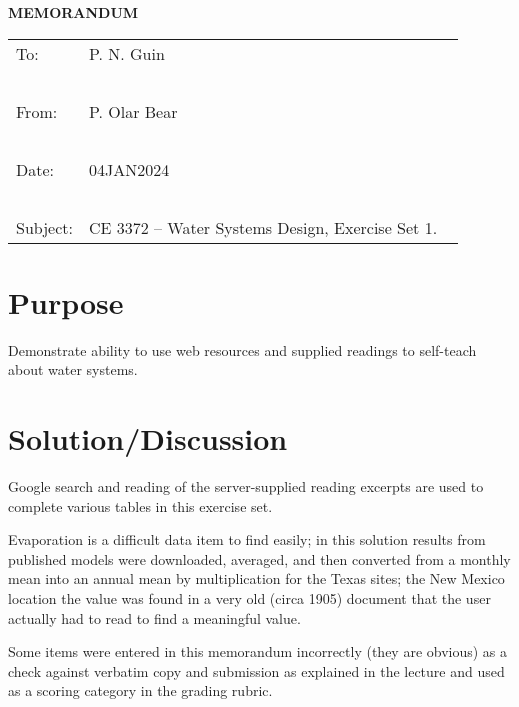 \documentclass[12pt]{article}
\begin{document}
\begin{center}
\textbf{MEMORANDUM}
\end{center}
\begingroup
\begin{tabular}{p{1in} p{5in}}
\hline
\hline
To: & P. N. Guin \\ ~\\
From: & P. Olar Bear \\ ~\\
Date: & 04JAN2024 \\ ~\\
Subject: & CE 3372 -- Water Systems Design, Exercise Set 1. ~\\
\hline
\hline
\end{tabular}
\endgroup
\section*{{Purpose}} 
Demonstrate ability to use web resources and supplied readings to self-teach about water systems.
\section*{Solution/Discussion}
Google search and reading of the server-supplied reading excerpts are used to complete various tables in this exercise set.

Evaporation is a difficult data item to find easily; in this solution results from published models were downloaded, averaged, and then converted from a monthly mean into an annual mean by multiplication for the Texas sites; the New Mexico location the value was found in a very old (circa 1905) document that the user actually had to read to find a meaningful value.  

Some items were entered in this memorandum incorrectly (they are obvious) as a check against verbatim copy and submission as explained in the lecture and used as a scoring category in the grading rubric.
\end{document}
